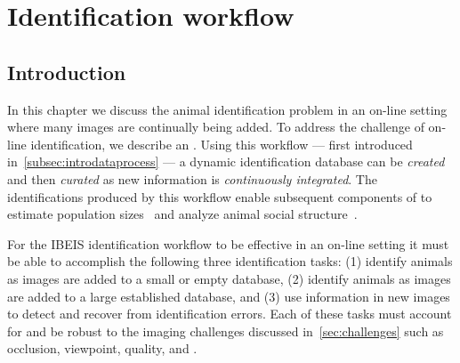 \begin{comment}
    ./texfix.py --reformat --fpaths chapter4-application.tex
    ./texfix.py --reformat --fpaths chapter4-application.tex --max-width=150 --diff
    ./texfix.py --reformat --fpaths chapter4-application.tex --max-width=80 -w
    ./texfix.py --fpaths chapter4-application.tex --outline --asmarkdown --numlines=99  --section="Correcting errors"
    ./texfix.py --fpaths chapter5-systemchapter.tex --outline --asmarkdown --numlines=999  -w
    ./texfix.py --fpaths chapter4-application.tex --outline --asmarkdown --numlines=999 -w
    # http://jaxedit.com/mark/
    mdview
\end{comment}

\chapter{Identification workflow}\label{chap:application}

\section{Introduction}\label{sec:intro4}
    In this chapter we discuss the animal identification problem in an on-line
      setting where many images are continually being added.
    To address the challenge of on-line identification, we describe an
      .
    Using this workflow --- first introduced in~\cref{subsec:introdataprocess}
      --- a dynamic identification database can be \emph{created} and then
      \emph{curated} as new information is \emph{continuously integrated}.
    The identifications produced by this workflow enable subsequent components
      of \IBEIS{} to estimate population sizes~\cite{rubenstein_ecology_2010}
      and analyze animal social structure~\cite{reda_visualizing_2011}.

    For the IBEIS identification workflow to be effective in an on-line
      setting it must be able to accomplish the following three identification
      tasks:
    (1) identify animals as images are added to a small or empty database,
    (2) identify animals as images are added to a large established database,
      and
    (3) use information in new images to detect and recover from
      identification errors.
    Each of these tasks must account for and be robust to the imaging
      challenges discussed in~\cref{sec:challenges} such as occlusion,
      viewpoint, quality, and \photobombing{}.

